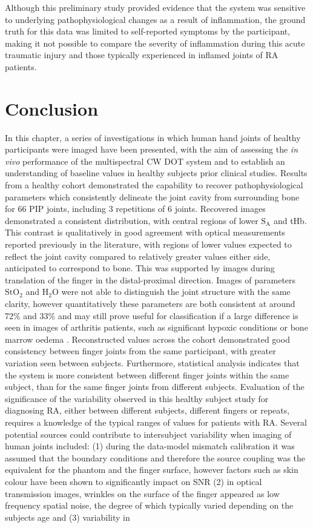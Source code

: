 \documentclass[twoside]{bhamthesis}
\theoremstyle{definition}
\begin{document}
Although this preliminary study provided evidence that the system was sensitive to underlying pathophysiological changes as a result of inflammation, the ground truth for this data was limited to self-reported symptoms by the participant, making it not possible to compare the severity of inflammation during this acute traumatic injury and those typically experienced in inflamed joints of RA patients.

\section{Conclusion}

In this chapter, a series of investigations in which human hand joints of healthy participants were imaged have been presented, with the aim of assessing the \textit{in vivo} performance of the multispectral CW DOT system and to establish an understanding of baseline values in healthy subjects prior clinical studies. Results from a healthy cohort demonstrated the capability to recover pathophysiological parameters which consistently delineate the joint cavity from surrounding bone for 66 PIP joints, including 3 repetitions of 6 joints. Recovered images demonstrated a consistent distribution, with central regions of lower $\mathrm{S_A}$ and tHb. This contrast is qualitatively in good agreement with optical measurements reported previously in the literature, with regions of lower values expected to reflect the joint cavity compared to relatively greater values either side, anticipated to correspond to bone. This was supported by images during translation of the finger in the distal-proximal direction. Images of parameters $\mathrm{StO_2}$ and $\mathrm{H_2O}$ were not able to distinguish the joint structure with the same clarity, however quantitatively these parameters are both consistent at around 72\% and 33\% and may still prove useful for classification if a large difference is seen in images of arthritis patients, such as significant hypoxic conditions \cite{ng2010synovial} or bone marrow oedema \cite{sudol2013significance}. Reconstructed values across the cohort demonstrated good consistency between finger joints from the same participant, with greater variation seen between subjects. Furthermore, statistical analysis indicates that the system is more consistent between different finger joints within the same subject, than for the same finger joints from different subjects. Evaluation of the significance of the variability observed in this healthy subject study for diagnosing RA, either between different subjects, different fingers or repeats, requires a knowledge of the typical ranges of values for patients with RA. Several potential sources could contribute to intersubject variability when imaging of human joints included: (1) during the data-model mismatch calibration it was assumed that the boundary conditions and therefore the source coupling was the equivalent for the phantom and the finger surface, however factors such as skin colour have been shown to significantly impact on SNR \cite{zonios2001skin} (2) in optical transmission images, wrinkles on the surface of the finger appeared as low frequency spatial noise, the degree of which typically varied depending on the subjects age and (3) variability in 
\end{document}
